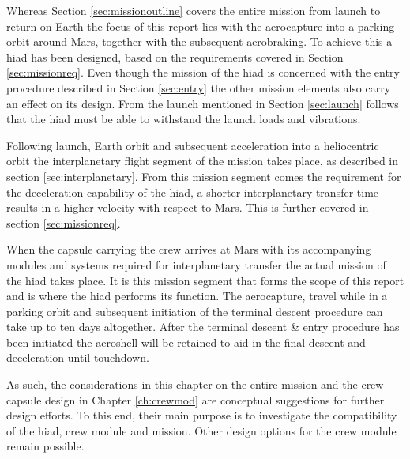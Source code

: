 Whereas Section \ref{sec:missionoutline} covers the entire mission from launch to return on Earth the focus of this report lies with the aerocapture into a parking orbit around Mars, together with the subsequent aerobraking. To achieve this a \gls{hiad} has been designed, based on the requirements covered in Section \ref{sec:missionreq}. Even though the mission of the \gls{hiad} is concerned with the entry procedure described in Section \ref{sec:entry} the other mission elements also carry an effect on its design. From the launch mentioned in Section \ref{sec:launch} follows that the \gls{hiad} must be able to withstand the launch loads and vibrations. 

Following launch, Earth orbit and subsequent acceleration into a heliocentric orbit the interplanetary flight segment of the mission takes place, as described in section \ref{sec:interplanetary}. From this mission segment comes the requirement for the deceleration capability of the \gls{hiad}, a shorter interplanetary transfer time results in a higher velocity with respect to Mars. This is further covered in section \ref{sec:missionreq}. 

When the capsule carrying the crew arrives at Mars with its accompanying modules and systems required for interplanetary transfer the actual mission of the \gls{hiad} takes place. It is this mission segment that forms the scope of this report and is where the \gls{hiad} performs its function. The aerocapture, travel while in a parking orbit and subsequent initiation of the terminal descent procedure can take up to ten days altogether. After the terminal descent \& entry procedure has been initiated the aeroshell will be retained to aid in the final descent and deceleration until touchdown.

As such, the considerations in this chapter on the entire mission and the crew capsule design in Chapter \ref{ch:crewmod} are conceptual suggestions for further design efforts. To this end, their main purpose is to investigate the compatibility of the \gls{hiad}, crew module and mission. Other design options for the crew module remain possible.